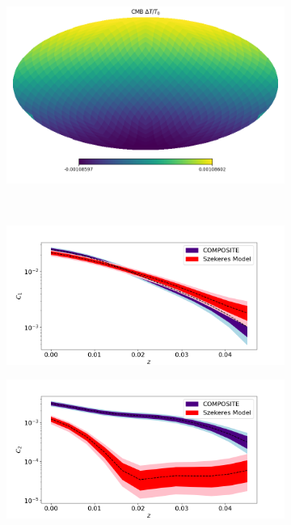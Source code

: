 \documentclass[a4paper,12pt]{report}
\begin{document}
\begin{figure}[ht]
    \centering
    \begin{subfigure}[b]{105mm}
        \centering
        \includegraphics[width=\textwidth]{BNW Model MCMC/best comp fit/CMB.png}
        \caption{}
    \end{subfigure}
    \\
    \begin{subfigure}[b]{105mm}
        \centering
        \includegraphics[width=\textwidth]{BNW Model MCMC/best comp fit/Hub C1.png}
        \caption{}
    \end{subfigure}
    \hfill
    \begin{subfigure}[b]{105mm}
        \centering
        \includegraphics[width=\textwidth]{BNW Model MCMC/best comp fit/Hub C2.png}

\end{subfigure}
\end{figure}
\end{document}

